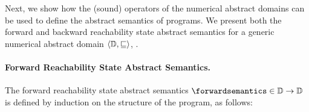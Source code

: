Next, we show how the (sound) operators of the numerical abstract domains can be used to define the abstract semantics of programs. We present both the forward and backward reachability state abstract semantics for a generic numerical abstract domain $\langle \mathbb{D}, \sqsubseteq \rangle$, \cf{} .

\paragraph{Forward Reachability State Abstract Semantics.}

The forward reachability state abstract semantics $\forwardsemantics\in\forwardtype$ is defined by induction on the structure of the program, as follows:

